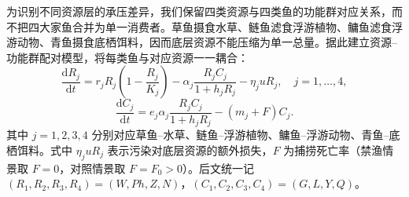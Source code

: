 \documentclass{MMCStyle}
\begin{document}
为识别不同资源层的承压差异，我们保留四类资源与四类鱼的功能群对应关系，而不把四大家鱼合并为单一消费者。草鱼摄食水草、鲢鱼滤食浮游植物、鳙鱼滤食浮游动物、青鱼摄食底栖饵料，因而底层资源不能压缩为单一总量。据此建立资源--功能群配对模型，将每类鱼与对应资源一一耦合：
\begin{equation}
\frac{\mathrm{d}R_j}{\mathrm{d}t}
=r_j R_j\left(1-\frac{R_j}{K_j}\right)-\alpha_j\frac{R_j C_j}{1+h_jR_j}-\eta_j u R_j,\quad j=1,\dots,4,
\end{equation}
\begin{equation}
\frac{\mathrm{d}C_j}{\mathrm{d}t}
=e_j\alpha_j\frac{R_j C_j}{1+h_jR_j}-(m_j+F)C_j.
\end{equation}
其中 $j=1,2,3,4$ 分别对应草鱼--水草、鲢鱼--浮游植物、鳙鱼--浮游动物、青鱼--底栖饵料。式中 $\eta_j u R_j$ 表示污染对底层资源的额外损失，$F$ 为捕捞死亡率（禁渔情景取 $F=0$，对照情景取 $F=F_0>0$）。后文统一记 $(R_1,R_2,R_3,R_4)=(W,Ph,Z,N)$，$(C_1,C_2,C_3,C_4)=(G,L,Y,Q)$。
\end{document}
